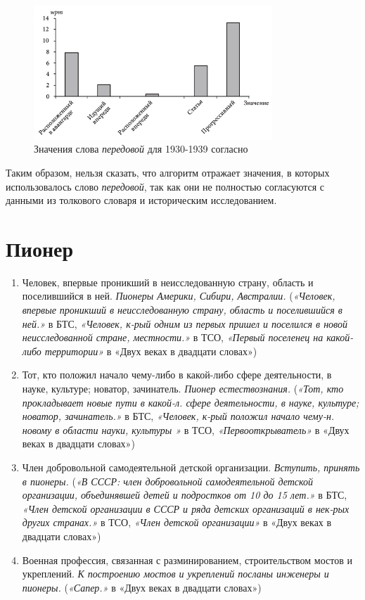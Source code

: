\begin{figure}[H]
    \centering %
    \includegraphics[width=0.8\textwidth]{img/book/peredovoj/1930-1939}
    \caption{Значения слова \textit{передовой} для 1930-1939 согласно~\cite{TwoCenturies}}
    \label{fig:TwoCenturiesPeredovoj2}
\end{figure}

Таким образом, нельзя сказать, что алгоритм отражает значения, в которых использовалось
слово \textit{передовой}, так как они не полностью согласуются
с данными из толкового словаря и историческим исследованием.

\section*{Пионер}

\begin{enumerate}
    \item Человек, впервые проникший в неисследованную страну, область и поселившийся в ней. \textit{Пионеры Америки, Сибири, Австралии.}
(\textit{«Человек, впервые проникший в неисследованную страну, область и поселившийся в ней.»} в БТС,
\textit{«Человек, к-рый одним из первых пришел и поселился в новой неисследованной стране, местности.»} в ТСО,
\textit{«Первый поселенец на какой-либо территории»} в «Двух веках в двадцати словах»)

    \item Тот, кто положил начало чему-либо в какой-либо сфере деятельности, в науке, культуре; новатор, зачинатель. \textit{Пионер естествознания.}
(\textit{«Тот, кто прокладывает новые пути в какой-л. сфере деятельности, в науке, культуре; новатор, зачинатель.»} в БТС,
\textit{«Человек, к-рый положил начало чему-н. новому в области науки, культуры »} в ТСО,
\textit{«Первооткрыватель»} в «Двух веках в двадцати словах»)

    \item Член добровольной самодеятельной детской организации. \textit{Вступить, принять в пионеры.}
(\textit{«В СССР: член добровольной самодеятельной детской организации, объединявшей детей и подростков от 10 до 15 лет.»} в БТС,
\textit{«Член детской организации в СССР и ряда детских организаций в нек-рых других странах.»} в ТСО,
\textit{«Член детской организации»} в «Двух веках в двадцати словах»)

    \item Военная профессия, связанная с разминированием, строительством мостов и укреплений. \textit{К построению мостов и укреплений посланы инженеры и пионеры.}
(\textit{«Сапер.»} в «Двух веках в двадцати словах»)
\end{enumerate}

